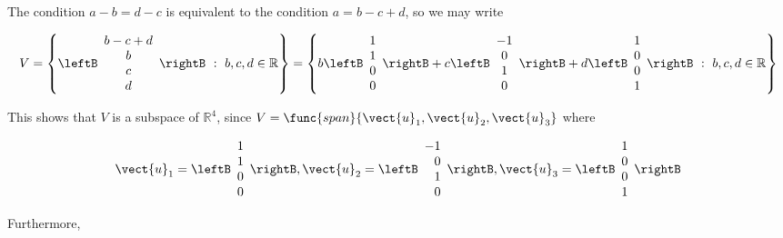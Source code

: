 \begin{solution}
The condition $a-b=d-c$ is equivalent to the condition
$a=b-c+d$, so we may write

\[ V =\left\{
\leftB\begin{array}{c} b-c+d\\ b\\ c\\ d\end{array}\rightB ~:~b,c,d  \in\mathbb{R}
\right\}
= \left\{
b\leftB\begin{array}{c} 1\\ 1\\ 0\\ 0\end{array}\rightB
+c\leftB\begin{array}{c} -1\\ 0\\ 1\\ 0\end{array}\rightB
+d\leftB\begin{array}{c} 1\\ 0\\ 0\\ 1\end{array}\rightB
~:~ b,c,d\in\mathbb{R} \right\}
\]

This shows that $V$ is a subspace of $\mathbb{R}^4$,
since $V=\func{span}\{ \vect{u}_1, \vect{u}_2, \vect{u}_3 \}$ where

\begin{equation*}
\vect{u}_1  =  \leftB\begin{array}{r} 
1 \\
1 \\
0 \\
0 \end{array}\rightB, \vect{u}_2  =  \leftB\begin{array}{r} 
-1 \\
 0 \\
 1 \\
 0 \end{array}\rightB, \vect{u}_3  =  \leftB\begin{array}{r} 
1 \\
 0 \\
 0 \\
 1 \end{array}\rightB
\end{equation*}

Furthermore,


\end{solution}
